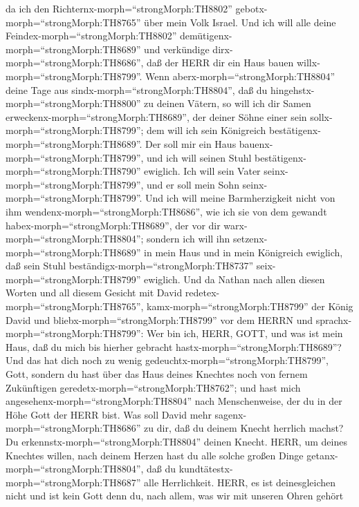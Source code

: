 da ich den Richternx-morph=``strongMorph:TH8802''
gebotx-morph=``strongMorph:TH8765'' über mein Volk Israel. 
Und ich will alle deine Feindex-morph=``strongMorph:TH8802''
demütigenx-morph=``strongMorph:TH8689'' und verkündige
dirx-morph=``strongMorph:TH8686'', daß der HERR dir ein Haus bauen
willx-morph=``strongMorph:TH8799''.  Wenn
aberx-morph=``strongMorph:TH8804'' deine Tage aus
sindx-morph=``strongMorph:TH8804'', daß du
hingehstx-morph=``strongMorph:TH8800'' zu deinen Vätern, so will ich dir
Samen erweckenx-morph=``strongMorph:TH8689'', der deiner Söhne einer
sein sollx-morph=``strongMorph:TH8799''; dem will ich sein Königreich
bestätigenx-morph=``strongMorph:TH8689''.  Der soll mir ein
Haus bauenx-morph=``strongMorph:TH8799'', und ich will seinen Stuhl
bestätigenx-morph=``strongMorph:TH8790'' ewiglich.  Ich
will sein Vater seinx-morph=``strongMorph:TH8799'', und er soll mein
Sohn seinx-morph=``strongMorph:TH8799''. Und ich will meine
Barmherzigkeit nicht von ihm wendenx-morph=``strongMorph:TH8686'', wie
ich sie von dem gewandt habex-morph=``strongMorph:TH8689'', der vor dir
warx-morph=``strongMorph:TH8804'';  sondern ich will ihn
setzenx-morph=``strongMorph:TH8689'' in mein Haus und in mein Königreich
ewiglich, daß sein Stuhl beständigx-morph=``strongMorph:TH8737''
seix-morph=``strongMorph:TH8799'' ewiglich.  Und da Nathan
nach allen diesen Worten und all diesem Gesicht mit David
redetex-morph=``strongMorph:TH8765'', 
kamx-morph=``strongMorph:TH8799'' der König David und
bliebx-morph=``strongMorph:TH8799'' vor dem HERRN und
sprachx-morph=``strongMorph:TH8799'': Wer bin ich, HERR, GOTT, und was
ist mein Haus, daß du mich bis hierher gebracht
hastx-morph=``strongMorph:TH8689''?  Und das hat dich noch
zu wenig gedeuchtx-morph=``strongMorph:TH8799'', Gott, sondern du hast
über das Haus deines Knechtes noch von fernem Zukünftigen
geredetx-morph=``strongMorph:TH8762''; und hast mich
angesehenx-morph=``strongMorph:TH8804'' nach Menschenweise, der du in
der Höhe Gott der HERR bist.  Was soll David mehr
sagenx-morph=``strongMorph:TH8686'' zu dir, daß du deinem Knecht
herrlich machst? Du erkennstx-morph=``strongMorph:TH8804'' deinen
Knecht.  HERR, um deines Knechtes willen, nach deinem
Herzen hast du alle solche großen Dinge
getanx-morph=``strongMorph:TH8804'', daß du
kundtätestx-morph=``strongMorph:TH8687'' alle Herrlichkeit.
 HERR, es ist deinesgleichen nicht und ist kein Gott denn
du, nach allem, was wir mit unseren Ohren gehört
